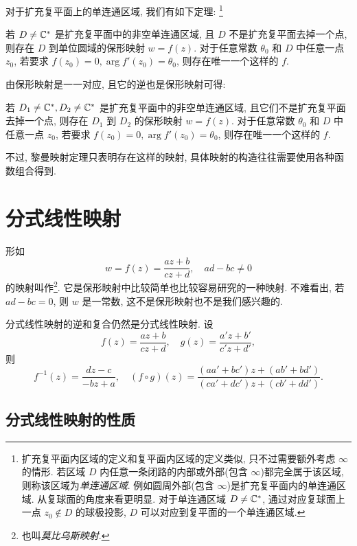对于扩充复平面上的单连通区域, 我们有如下定理:
\footnote{
  扩充复平面内区域的定义和复平面内区域的定义类似, 只不过需要额外考虑 $\infty$ 的情形.
  若区域 $D$ 内任意一条闭路的内部或外部(包含 $\infty$)都完全属于该区域, 则称该区域为\emph{单连通区域}.
  例如圆周外部(包含 $\infty$)是扩充复平面内的单连通区域.
  从复球面的角度来看更明显.
  对于单连通区域 $D\neq {\mathbb{C}}^*$, 通过对应复球面上一点 $z_0\notin D$ 的球极投影, $D$ 可以对应到复平面的一个单连通区域.
}

\begin{theorem}[黎曼映射定理]
  \label{thm:riemann-mapping}
  若 $D\neq{\mathbb{C}}^*$ 是扩充复平面中的非空单连通区域, 且 $D$ 不是扩充复平面去掉一个点, 则存在 $D$ 到单位圆域的保形映射 $w=f(z)$.
  对于任意常数 $\theta_0$ 和 $D$ 中任意一点 $z_0$, 若要求 $f(z_0)=0,\arg f'(z_0)=\theta_0$, 则存在唯一一个这样的 $f$.
\end{theorem}

由保形映射是一一对应, 且它的逆也是保形映射可得:
\begin{corollary}
  若 $D_1\neq{\mathbb{C}}^*,D_2\neq{\mathbb{C}}^*$ 是扩充复平面中的非空单连通区域, 且它们不是扩充复平面去掉一个点, 则存在 $D_1$ 到 $D_2$ 的保形映射 $w=f(z)$.
  对于任意常数 $\theta_0$ 和 $D$ 中任意一点 $z_0$, 若要求 $f(z_0)=0,\arg f'(z_0)=\theta_0$, 则存在唯一一个这样的 $f$.
\end{corollary}

不过, 黎曼映射定理只表明存在这样的映射, 具体映射的构造往往需要使用各种函数组合得到.



\section{分式线性映射}

形如
\[
  w=f(z)=\dfrac{az+b}{cz+d},\quad ad-bc\neq 0
\]
的映射叫作\footnote{
  也叫\emph{莫比乌斯映射}.
}.
它是保形映射中比较简单也比较容易研究的一种映射.
不难看出, 若 $ad-bc=0$, 则 $w$ 是一常数, 这不是保形映射也不是我们感兴趣的.

分式线性映射的逆和复合仍然是分式线性映射.
设
\[
  f(z)=\frac{az+b}{cz+d},\quad
  g(z)=\frac{a'z+b'}{c'z+d'},
\]
则
\[
  f^{-1}(z)=\frac{dz-c}{-bz+a},\quad
  (f\circ g)(z)=\frac{(aa'+bc')z+(ab'+bd')}{(ca'+dc')z+(cb'+dd')}.
\]

\subsection{分式线性映射的性质}

